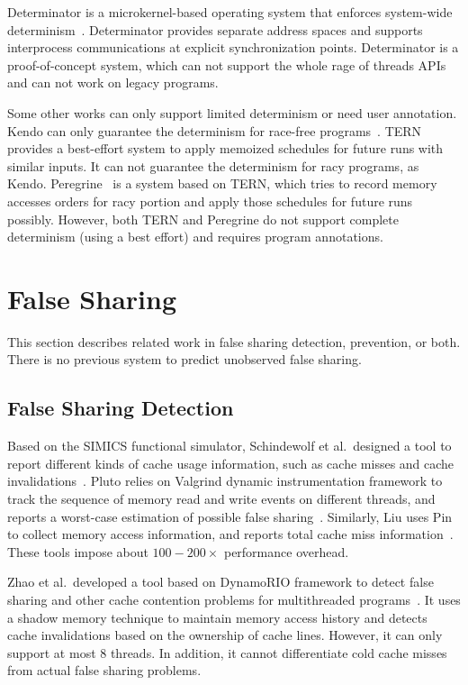 Determinator is a microkernel-based operating system that enforces system-wide determinism~\cite{efficient-system-enforced}. Determinator provides separate address spaces and supports interprocess
communications at explicit synchronization points. 
Determinator is a proof-of-concept system, which can not support the whole rage of
threads APIs and can not work on legacy programs.  

Some other works can only support limited determinism or need user annotation.
Kendo can only guarantee the determinism for race-free programs~\cite{1508256}. 
TERN~\cite{stable-deterministic} provides a best-effort system to 
apply memoized schedules for future runs with similar inputs. 
It can not guarantee the determinism for racy programs, as Kendo. 
Peregrine~\cite{peregrine:sosp11} is a system based on TERN, which tries to record
 memory accesses orders for racy portion and apply those schedules for future runs possibly.
However, both TERN and Peregrine do not support complete determinism (using a best effort)
and requires program annotations. 

\section{False Sharing}

This section describes related work in false sharing detection, prevention, or both. There is no previous
system to predict unobserved false sharing.

\subsection{False Sharing Detection}
Based on the SIMICS functional simulator, Schindewolf et al.\ designed a tool to report different kinds of cache usage information, such as cache misses and cache invalidations~\cite{falseshare:simulator}. Pluto relies on Valgrind dynamic instrumentation framework to track the sequence of memory read and write events on different threads, and reports a worst-case estimation of possible false sharing~\cite{falseshare:binaryinstrumentation1}.
Similarly, Liu uses Pin to collect memory access information, and reports total cache miss information~\cite{falseshare:binaryinstrumentation2}.
These tools impose about $100-200\times$ performance overhead.

Zhao et al.\ developed a tool based on DynamoRIO framework to detect false sharing and other cache contention problems
for multithreaded programs~\cite{qinzhao}. 
It uses a shadow memory technique to maintain memory access history and detects cache invalidations based on the ownership of cache lines. However, it can only support at most $8$ threads. In addition, it cannot differentiate cold cache misses from actual false sharing problems.


